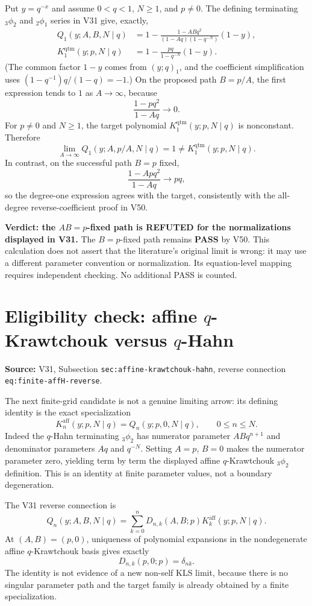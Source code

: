 \documentclass[11pt]{article}
\begin{document}
Put $y=q^{-x}$ and assume $0<q<1$, $N\ge1$, and $p\ne0$.
The defining terminating ${}_3\phi_2$ and ${}_2\phi_1$ series
in V31 give, exactly,
\begin{align*}
 Q_1(y;A,B,N\mid q)
 &=1-\frac{1-ABq^2}{(1-Aq)(1-q^{-N})}(1-y),\\
 K_1^{\mathrm{qtm}}(y;p,N\mid q)
 &=1-\frac{pq}{1-q^{-N}}(1-y).
\end{align*}
(The common factor $1-y$ comes from $(y;q)_1$, and the
coefficient simplification uses $(1-q^{-1})q/(1-q)=-1$.)
On the proposed path $B=p/A$, the first expression tends to $1$
as $A\to\infty$, because
\[
 \frac{1-pq^2}{1-Aq}\longrightarrow0.
\]
For $p\ne0$ and $N\ge1$, the target polynomial
$K_1^{\mathrm{qtm}}(y;p,N\mid q)$ is nonconstant. Therefore
\[
 \boxed{\lim_{A\to\infty}Q_1(y;A,p/A,N\mid q)=1
 \ne K_1^{\mathrm{qtm}}(y;p,N\mid q).}
\]
In contrast, on the successful path $B=p$ fixed,
\[
 \frac{1-Apq^2}{1-Aq}\longrightarrow pq,
\]
so the degree-one expression agrees with the target, consistently
with the all-degree reverse-coefficient proof in V50.

\noindent\textbf{Verdict: the $AB=p$-fixed path is REFUTED for the
normalizations displayed in V31.} The $B=p$-fixed path remains
\textbf{PASS} by V50. This calculation does not assert that the
literature's original limit is wrong: it may use a different
parameter convention or normalization. Its equation-level mapping
requires independent checking. No additional PASS is counted.

\section{Eligibility check: affine $q$-Krawtchouk versus $q$-Hahn}
\noindent\textbf{Source:} V31, Subsection
\texttt{sec:affine-krawtchouk-hahn}, reverse connection
\texttt{eq:finite-affH-reverse}.
\medskip

The next finite-grid candidate is not a genuine limiting arrow:
its defining identity is the exact specialization
\[
 K_n^{\mathrm{aff}}(y;p,N\mid q)=Q_n(y;p,0,N\mid q),
 \qquad 0\le n\le N.
\]
Indeed the $q$-Hahn terminating ${}_3\phi_2$ has numerator
parameter $ABq^{n+1}$ and denominator parameters $Aq$ and
$q^{-N}$. Setting $A=p$, $B=0$ makes the numerator parameter
zero, yielding term by term the displayed affine $q$-Krawtchouk
${}_3\phi_2$ definition. This is an identity at finite parameter
values, not a boundary degeneration.

The V31 reverse connection is
\[
 Q_n(y;A,B,N\mid q)
 =\sum_{k=0}^n D_{n,k}(A,B;p)
 K_k^{\mathrm{aff}}(y;p,N\mid q).
\]
At $(A,B)=(p,0)$, uniqueness of polynomial expansions in the
nondegenerate affine $q$-Krawtchouk basis gives exactly
\[
 D_{n,k}(p,0;p)=\delta_{nk}.
\]
The identity is not evidence of a new non-self KLS limit, because
there is no singular parameter path and the target family is
already obtained by a finite specialization.
\end{document}
